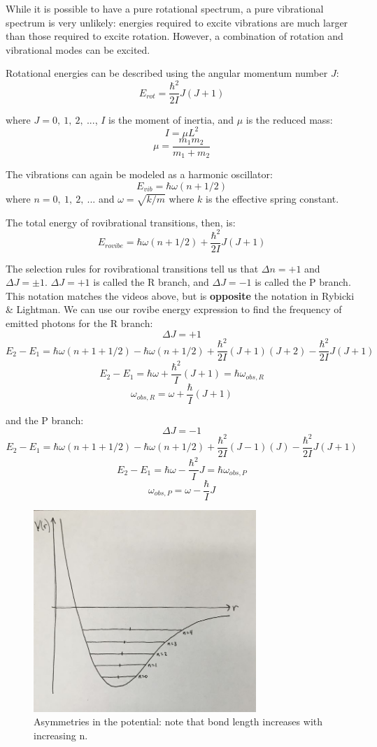 \documentclass{article}
\begin{document}
While it is possible to have a pure rotational spectrum, a pure vibrational spectrum is very unlikely: energies required to excite vibrations are much larger than those required to excite rotation. However, a combination of rotation and vibrational modes can be excited. 

Rotational energies can be described using the angular momentum number $J$:
$$E_{rot} = \frac{\hbar^2}{2I} J (J+1) $$

where $J = 0,\ 1,\ 2,\ ...$, $I$ is the moment of inertia, and $\mu$ is the reduced mass:
$$ I = \mu L^2 $$
$$ \mu = \frac{m_1 m_2}{m_1 + m_2} $$

The vibrations can again be modeled as a harmonic oscillator:
$$ E_{vib} = \hbar \omega (n + 1/2) $$
where $n = 0,\ 1,\ 2,\ ...$ and $\omega = \sqrt{k/m}$ where $k$ is the effective spring constant.

The total energy of rovibrational transitions, then, is:
$$ E_{rovibe} = \hbar \omega (n+1/2) + \frac{\hbar^2}{2I} J (J+1) $$

The selection rules for rovibrational transitions tell us that $\Delta n = +1$ and $\Delta J = \pm 1$. $\Delta J = +1$ is called the R branch, and $\Delta J = -1$ is called the P branch. This notation matches the videos above, but is {\bf opposite} the notation in Rybicki \& Lightman. We can use our rovibe energy expression to find the frequency of emitted photons for the R branch:
$$ \Delta J = +1 $$
$$ E_2 - E_1 = \hbar \omega (n+1 + 1/2) - \hbar \omega (n + 1/2) + \frac{\hbar^2}{2I} (J+1)(J+2) - \frac{\hbar^2}{2I} J (J+1) $$
$$ E_2 - E_1 = \hbar \omega + \frac{\hbar^2}{I} (J+1) = \hbar \omega_{obs, R} $$
$$ \omega_{obs, R} = \omega + \frac{\hbar}{I} (J+1) $$

and the P branch:
$$ \Delta J = -1 $$
$$ E_2 - E_1 = \hbar \omega (n+1 + 1/2) - \hbar \omega (n + 1/2) + \frac{\hbar^2}{2I} (J-1)(J) - \frac{\hbar^2}{2I} J (J+1) $$
$$ E_2 - E_1 = \hbar \omega - \frac{\hbar^2}{I} J = \hbar \omega_{obs, P} $$
$$ \omega_{obs, P} = \omega - \frac{\hbar}{I} J $$


\begin{figure}[ht]
    \centering
    \includegraphics[width=0.75\textwidth]{figures/659px-Asymm.jpg}
    \caption{Asymmetries in the potential: note that bond length increases with increasing n.}
    \label{fig:asymm}
\end{figure}
\end{document}
